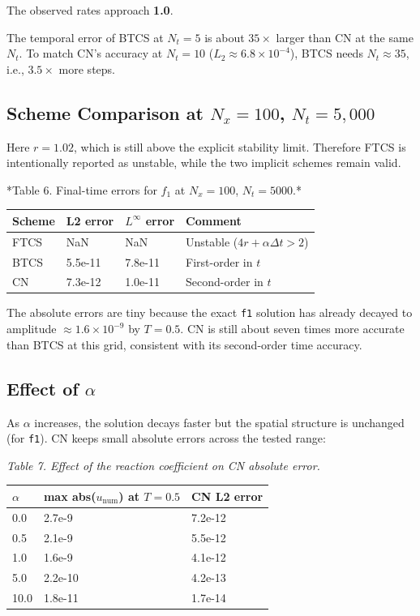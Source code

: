 \documentclass[11pt,a4paper]{article}
\begin{document}
The observed rates approach \textbf{1.0}.

The temporal error of BTCS at $N_t = 5$ is about $35\times$ larger than CN at the same $N_t$. To match CN's accuracy at $N_t = 10$ ($L_2 \approx 6.8 \times 10^{-4}$), BTCS needs $N_t \approx 35$, i.e., $3.5\times$ more steps.

\subsection{Scheme Comparison at $N_x = 100$, $N_t = 5{,}000$}

Here $r=1.02$, which is still above the explicit stability limit. Therefore FTCS is intentionally reported as unstable, while the two implicit schemes remain valid.

*Table 6. Final-time errors for $f_1$ at $N_x=100$, $N_t=5000$.*

\begin{center}
\renewcommand{\arraystretch}{1.15}
\begin{tabular}{|p{}|p{}|p{}|p{}|}
\hline
Scheme & L2 error & $L^\infty$ error & Comment \\
\hline
FTCS & NaN & NaN & Unstable ($4r+\alpha\Delta t>2$) \\
BTCS & 5.5e-11 & 7.8e-11 & First-order in $t$ \\
CN & 7.3e-12 & 1.0e-11 & Second-order in $t$ \\
\hline
\end{tabular}
\end{center}

The absolute errors are tiny because the exact \texttt{f1} solution has already decayed to amplitude $\approx 1.6\times 10^{-9}$ by $T=0.5$. CN is still about seven times more accurate than BTCS at this grid, consistent with its second-order time accuracy.

\subsection{Effect of $\alpha$}

As $\alpha$ increases, the solution decays faster but the spatial structure is unchanged (for \texttt{f1}). CN keeps small absolute errors across the tested range:

\emph{Table 7. Effect of the reaction coefficient on CN absolute error.}

\begin{center}
\renewcommand{\arraystretch}{1.15}
\begin{tabular}{|p{}|p{}|p{}|}
\hline
$\alpha$ & max abs($u_{\mathrm{num}}$) at $T=0.5$ & CN L2 error \\
\hline
0.0 & 2.7e-9 & 7.2e-12 \\
0.5 & 2.1e-9 & 5.5e-12 \\
1.0 & 1.6e-9 & 4.1e-12 \\
5.0 & 2.2e-10 & 4.2e-13 \\
10.0 & 1.8e-11 & 1.7e-14 \\
\hline
\end{tabular}
\end{center}
\end{document}
